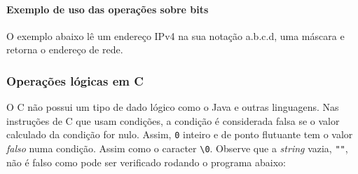 \documentclass[
]{article}
\newenvironment{Shaded}{}{}
\newcommand{\ControlFlowTok}[1]{\textcolor[rgb]{0.00,0.44,0.13}{\textbf{#1}}}
\newcommand{\DataTypeTok}[1]{\textcolor[rgb]{0.56,0.13,0.00}{#1}}
\newcommand{\DecValTok}[1]{\textcolor[rgb]{0.25,0.63,0.44}{#1}}
\newcommand{\ImportTok}[1]{#1}
\newcommand{\NormalTok}[1]{#1}
\newcommand{\PreprocessorTok}[1]{\textcolor[rgb]{0.74,0.48,0.00}{#1}}
\newcommand{\SpecialCharTok}[1]{\textcolor[rgb]{0.25,0.44,0.63}{#1}}
\newcommand{\StringTok}[1]{\textcolor[rgb]{0.25,0.44,0.63}{#1}}
\begin{document}
\hypertarget{exemplo-de-uso-das-operauxe7uxf5es-sobre-bits}{%
\paragraph{Exemplo de uso das operações sobre
bits}\label{exemplo-de-uso-das-operauxe7uxf5es-sobre-bits}}

O exemplo abaixo lê um endereço IPv4 na sua notação a.b.c.d, uma máscara
e retorna o endereço de rede.

\begin{Shaded}
\end{Shaded}

\hypertarget{operauxe7uxf5es-luxf3gicas-em-c}{%
\subsubsection{Operações lógicas em
C}\label{operauxe7uxf5es-luxf3gicas-em-c}}

O C não possui um tipo de dado lógico como o Java e outras linguagens.
Nas instruções de C que usam condições, a condição é considerada falsa
se o valor calculado da condição for nulo. Assim, \texttt{0} inteiro e
de ponto flutuante tem o valor \emph{falso} numa condição. Assim como o
caracter \texttt{\textquotesingle{}\textbackslash{}0\textquotesingle{}}.
Observe que a \emph{string} vazia, \texttt{""}, não é falso como pode
ser verificado rodando o programa abaixo:
\end{document}
